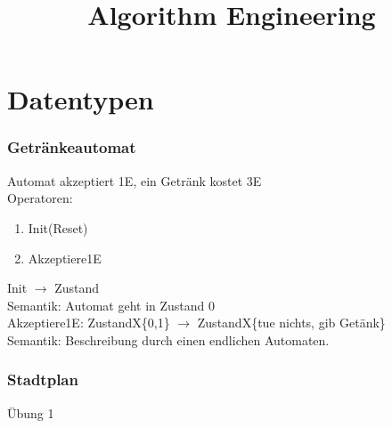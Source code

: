 \documentclass[a4paper]{article}
\begin{document}
\title{Algorithm Engineering}
\maketitle
\section*{Datentypen}

\subsubsection*{Getränkeautomat}
Automat akzeptiert 1E, ein Getränk kostet 3E\\
Operatoren:
\begin{enumerate}
\item Init(Reset)
\item Akzeptiere1E
\end{enumerate}
Init $\rightarrow$ Zustand\\
\hspace*{0.5cm}Semantik: Automat geht in Zustand 0\\
Akzeptiere1E: ZustandX\{0,1\} $\rightarrow$ ZustandX\{tue nichts, gib Getänk\}\\
\hspace*{0.5cm}Semantik: Beschreibung durch einen endlichen Automaten.
\subsubsection*{Stadtplan}
Übung 1
\end{document}
